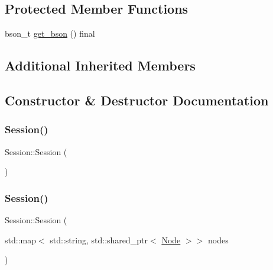 \subsection*{Protected Member Functions}
\begin{DoxyCompactItemize}
\item 
bson\+\_\+t \hyperlink{class_session_aa517fe6138a0cc32e27ddf1eb7331520}{get\+\_\+bson} () final
\end{DoxyCompactItemize}
\subsection*{Additional Inherited Members}


\subsection{Constructor \& Destructor Documentation}
\mbox{\label{class_session_ad92ef09b872c9227e38a6efdd4d8a837}} 
\subsubsection{\texorpdfstring{Session()}{Session()}\hspace{0.1cm}{\footnotesize\ttfamily [1/2]}}
{\footnotesize\ttfamily Session\+::\+Session (\begin{DoxyParamCaption}{ }\end{DoxyParamCaption})\hspace{0.3cm}{\ttfamily [inline]}}

\mbox{\label{class_session_a556c8971b03563ae3c94dc1d19cbed27}} 
\subsubsection{\texorpdfstring{Session()}{Session()}\hspace{0.1cm}{\footnotesize\ttfamily [2/2]}}
{\footnotesize\ttfamily Session\+::\+Session (\begin{DoxyParamCaption}\item[{std\+::map$<$ std\+::string, std\+::shared\+\_\+ptr$<$ \hyperlink{class_node}{Node} $>$$>$}]{nodes }\end{DoxyParamCaption})\hspace{0.3cm}{\ttfamily [inline]}}



